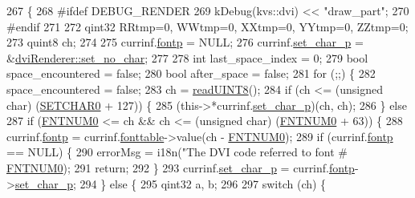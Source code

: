 \begin{DoxyCode}
267 \{
268 \textcolor{preprocessor}{#ifdef DEBUG\_RENDER}
269   kDebug(kvs::dvi) << \textcolor{stringliteral}{"draw\_part"};
270 \textcolor{preprocessor}{#endif}
271 
272   qint32 RRtmp=0, WWtmp=0, XXtmp=0, YYtmp=0, ZZtmp=0;
273   quint8 ch;
274 
275   currinf.\hyperlink{structdrawinf_a4a6ec248b5b071099ddf9b5e4f0255e2}{fontp}        = NULL;
276   currinf.\hyperlink{structdrawinf_a365a1c9700846921b83cc69e0f2780c6}{set\_char\_p}   = &\hyperlink{classdviRenderer_af39ff19024aab0a2da12815c14851f19}{dviRenderer::set\_no\_char};
277 
278   \textcolor{keywordtype}{int} last\_space\_index = 0;
279   \textcolor{keywordtype}{bool} space\_encountered = \textcolor{keyword}{false};
280   \textcolor{keywordtype}{bool} after\_space = \textcolor{keyword}{false};
281   \textcolor{keywordflow}{for} (;;) \{
282     space\_encountered = \textcolor{keyword}{false};
283     ch = \hyperlink{classbigEndianByteReader_ac5e3b96e3e09b30dbe57175763077c1f}{readUINT8}();
284     \textcolor{keywordflow}{if} (ch <= (\textcolor{keywordtype}{unsigned} \textcolor{keywordtype}{char}) (\hyperlink{dvi_8h_a2e9858de002bc52282d87bab4df56996}{SETCHAR0} + 127)) \{
285       (this->*currinf.\hyperlink{structdrawinf_a365a1c9700846921b83cc69e0f2780c6}{set\_char\_p})(ch, ch);
286     \} \textcolor{keywordflow}{else}
287       \textcolor{keywordflow}{if} (\hyperlink{dvi_8h_a031c4e9b81ae5d39f2ce2f718e3c1ba4}{FNTNUM0} <= ch && ch <= (\textcolor{keywordtype}{unsigned} \textcolor{keywordtype}{char}) (\hyperlink{dvi_8h_a031c4e9b81ae5d39f2ce2f718e3c1ba4}{FNTNUM0} + 63)) \{
288         currinf.\hyperlink{structdrawinf_a4a6ec248b5b071099ddf9b5e4f0255e2}{fontp} = currinf.\hyperlink{structdrawinf_ac68bb33a017c34bf63f8dce71ad3ef17}{fonttable}->value(ch - \hyperlink{dvi_8h_a031c4e9b81ae5d39f2ce2f718e3c1ba4}{FNTNUM0});
289         \textcolor{keywordflow}{if} (currinf.\hyperlink{structdrawinf_a4a6ec248b5b071099ddf9b5e4f0255e2}{fontp} == NULL) \{
290           errorMsg = i18n(\textcolor{stringliteral}{"The DVI code referred to font #%
      \hyperlink{dvi_8h_a031c4e9b81ae5d39f2ce2f718e3c1ba4}{FNTNUM0});
291           \textcolor{keywordflow}{return};
292         \}
293         currinf.\hyperlink{structdrawinf_a365a1c9700846921b83cc69e0f2780c6}{set\_char\_p} = currinf.\hyperlink{structdrawinf_a4a6ec248b5b071099ddf9b5e4f0255e2}{fontp}->\hyperlink{classTeXFontDefinition_a2901636eeb7920b42396cdbdd3f93774}{set\_char\_p};
294       \} \textcolor{keywordflow}{else} \{
295         qint32 a, b;
296 
297         \textcolor{keywordflow}{switch} (ch) \{
}
\end{DoxyCode}
